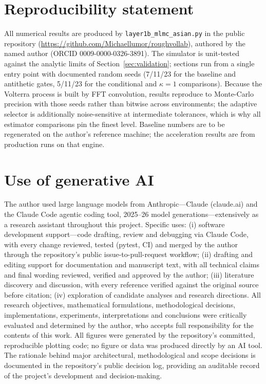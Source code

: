 \documentclass[11pt]{article}
\begin{document}
\section*{Reproducibility statement}

All numerical results are produced by \texttt{layer1b\_mlmc\_asian.py} in the public
repository (\url{https://github.com/Michaellumor/roughvollab}), authored by the named author
(ORCID 0009-0000-0326-3891). The simulator is unit-tested against the analytic limits of
Section~\ref{sec:validation}; sections run from a single entry point with documented random
seeds (7/11/23 for the baseline and antithetic gates, 5/11/23 for the conditional and
$\kappa=1$ comparisons). Because the Volterra process is built by FFT convolution, results
reproduce to Monte-Carlo precision with those seeds rather than bitwise across environments;
the adaptive selector is additionally noise-sensitive at intermediate tolerances, which is why
all estimator comparisons pin the finest level. Baseline numbers are to be regenerated on the
author's reference machine; the acceleration results are from production runs on that engine.

\section*{Use of generative AI}

The author used large language models from Anthropic---Claude (claude.ai) and the Claude
Code agentic coding tool, 2025--26 model generations---extensively as a research assistant
throughout this project. Specific uses: (i) software development support---code drafting,
review and debugging via Claude Code, with every change reviewed, tested (pytest, CI) and
merged by the author through the repository's public issue-to-pull-request workflow;
(ii) drafting and editing support for documentation and manuscript text, with all technical
claims and final wording reviewed, verified and approved by the author; (iii) literature
discovery and discussion, with every reference verified against the original source before
citation; (iv) exploration of candidate analyses and research directions. All research
objectives, mathematical formulations, methodological decisions, implementations,
experiments, interpretations and conclusions were critically evaluated and determined by
the author, who accepts full responsibility for the contents of this work. All figures
were generated by the repository's committed, reproducible plotting code; no figure or
data was produced directly by an AI tool. The rationale behind major architectural,
methodological and scope decisions is documented in the repository's public decision log,
providing an auditable record of the project's development and decision-making.
\end{document}
